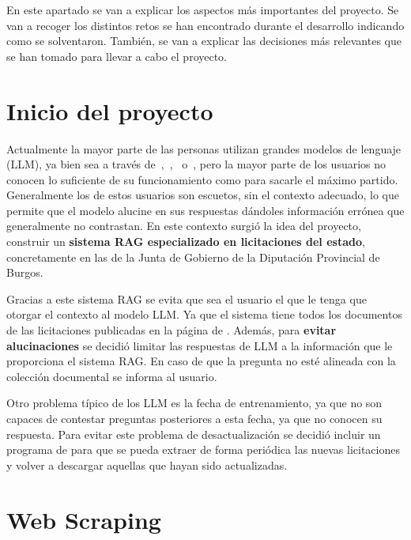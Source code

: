 
En este apartado se van a explicar los aspectos más importantes del proyecto. Se van a recoger los distintos retos se han encontrado durante el desarrollo indicando como se solventaron. También, se van a explicar las decisiones más relevantes que se han tomado para llevar a cabo el proyecto. 

\section{Inicio del proyecto}

Actualmente la mayor parte de las personas utilizan grandes modelos de lenguaje (LLM), ya bien sea a través de~,~,~ o~, pero la mayor parte de los usuarios no conocen lo suficiente de su funcionamiento como para sacarle el máximo partido. Generalmente los  de estos usuarios son escuetos, sin el contexto adecuado, lo que permite que el modelo alucine en sus respuestas dándoles información errónea que generalmente no contrastan. En este contexto surgió la idea del proyecto, construir un \textbf{sistema RAG especializado en licitaciones del estado}, concretamente en las de la Junta de Gobierno de la Diputación Provincial de Burgos.

Gracias a este sistema RAG se evita que sea el usuario el que le tenga que otorgar el contexto al modelo LLM. Ya que el sistema tiene todos los documentos de las licitaciones publicadas en la página de \contsec{}. Además, para \textbf{evitar alucinaciones} se decidió limitar las respuestas de LLM a la información que le proporciona el sistema RAG. En caso de que la pregunta no esté alineada con la colección documental se informa al usuario.

Otro problema típico de los LLM es la fecha de entrenamiento, ya que no son capaces de contestar preguntas posteriores a esta fecha, ya que no conocen su respuesta. Para evitar este problema de desactualización se decidió incluir un programa de  para que se pueda extraer de forma periódica las nuevas licitaciones y volver a descargar aquellas que hayan sido actualizadas. 

\section{Web Scraping}

